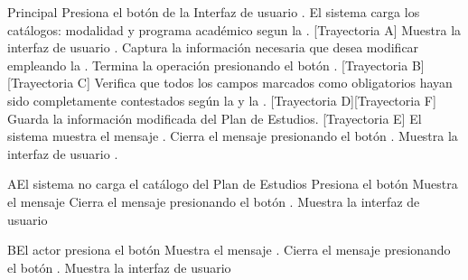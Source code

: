\begin{UCtrayectoria}{Principal}
    \UCpaso[\UCactor] Presiona el botón de la Interfaz de usuario .
    \UCpaso El sistema carga los catálogos: modalidad y programa académico segun la . [Trayectoria A]
    \UCpaso Muestra la interfaz de usuario .
    \UCpaso[\UCactor] Captura la información necesaria  que desea modificar empleando la .
    \UCpaso[\UCactor] Termina la operación presionando el botón . [Trayectoria B] [Trayectoria C]
    \UCpaso Verifica que todos los campos marcados como obligatorios hayan sido completamente contestados según la  y la . [Trayectoria D][Trayectoria F]
    \UCpaso Guarda la información modificada del Plan de Estudios.  [Trayectoria E]
    \UCpaso El sistema muestra el mensaje .
    \UCpaso[\UCactor] Cierra el mensaje presionando el botón .
    \UCpaso Muestra la interfaz de usuario .
\end{UCtrayectoria}
\begin{UCtrayectoriaA}{A}{El sistema no carga el catálogo del Plan de Estudios}
	\UCpaso[\UCactor] Presiona el botón 
	\UCpaso Muestra el mensaje 
	\UCpaso[\UCactor] Cierra el mensaje presionando el botón .
	 \UCpaso Muestra la interfaz de usuario 
\end{UCtrayectoriaA}
\begin{UCtrayectoriaA}{B}{El actor presiona el botón }
	\UCpaso Muestra el mensaje .
	\UCpaso[\UCactor] Cierra el mensaje presionando el botón .
	\UCpaso Muestra la interfaz de usuario 
\end{UCtrayectoriaA}
